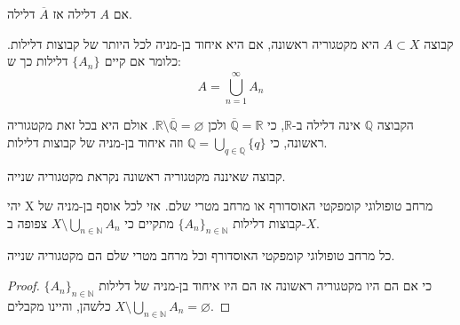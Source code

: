 \documentclass{tstextbook}
\begin{document}
\begin{corollary}
אם \(A\) דלילה אז \(\overline{A}\) דלילה.

\end{corollary}
\begin{definition}
קבוצה \(A\subset X\) היא מקטגוריה ראשונה, אם היא איחוד בן-מניה לכל היותר של קבוצות דלילות. כלומר אם קיים \(\{ A_{n} \}_{}\) דלילות כך ש:
$$A=\bigcup_{n=1}^{\infty}A_{n}$$

\end{definition}
\begin{example}[הרציונאלים]
הקבוצה \(\mathbb{Q}\) אינה דלילה ב-\(\mathbb{R}\), כי \(\overline{\mathbb{Q}}=\mathbb{R}\) ולכן \(\mathbb{R}\setminus\overline{\mathbb{Q}}=\varnothing\). אולם היא בכל זאת מקטגוריה ראשונה, כי \(\mathbb{Q}=\bigcup_{q\in\mathbb{Q}}\{q\}\) וזה איחוד בן-מניה של קבוצות דלילות.

\end{example}
\begin{definition}
קבוצה שאיננה מקטגוריה ראשונה נקראת מקטגוריה שנייה.

\end{definition}
\begin{theorem}
יהי X מרחב טופולוגי קומפקטי האוסדורף או מרחב מטרי שלם.
אזי לכל אוסף בן-מניה של קבוצות דלילות \(\{A_{n}\}_{n\in\mathbb{N}}\) מתקיים כי \(X\setminus\bigcup_{n\in\mathbb{N}}A_{n}\) צפופה ב-\(X\).

\end{theorem}
\begin{corollary}
כל מרחב טופולוגי קומפקטי האוסדורף וכל מרחב מטרי שלם הם מקטגוריה שנייה.

\end{corollary}
\begin{proof}
כי אם הם היו מקטגוריה ראשונה אז הם היו איחוד בן-מניה של דלילות \(\{A_{n}\}_{n\in\mathbb{N}}\) כלשהן, והיינו מקבלים \(X\setminus\bigcup_{n\in\mathbb{N}}A_{n}=\varnothing\).

\end{proof}
\end{document}
